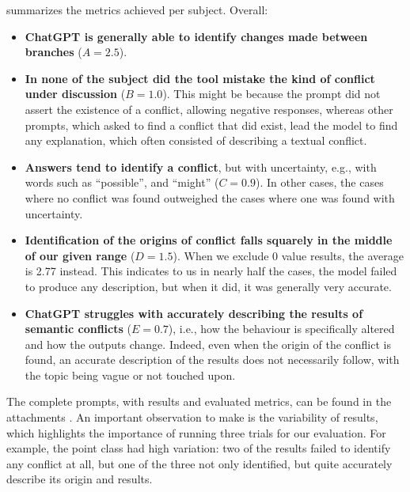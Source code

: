  summarizes the metrics achieved per subject. %
Overall:
%
\begin{itemize}
  \item \textbf{ChatGPT is generally able to identify changes made between branches} ($A=2.5$).

  \item \textbf{In none of the subject did the tool mistake the kind of conflict under discussion} ($B=1.0$). This might be because the prompt did not assert the existence of a conflict, allowing negative responses, whereas other prompts, which asked to find a conflict that did exist, lead the model to find any explanation, which often consisted of describing a textual conflict.

  \item \textbf{Answers tend to identify a conflict}, but with uncertainty, e.g., with words such as ``possible'', and ``might'' ($C=0.9$). In other cases, the cases where no conflict was found outweighed the cases where one was found with uncertainty.

  \item \textbf{Identification of the origins of conflict falls squarely in the middle of our given range} ($D=1.5$).  When we exclude 0 value results, the average is 2.77 instead. This indicates to us in nearly half the cases, the model failed to produce any description, but when it did, it was generally very accurate.

  \item \textbf{ChatGPT struggles with accurately describing the results of semantic conflicts} ($E=0.7$), i.e., how the behaviour is specifically altered and how the outputs change. Indeed, even when the origin of the conflict is found, an accurate description of the results does not necessarily follow, with the topic being vague or not touched upon.
\end{itemize}

The complete prompts, with results and evaluated metrics, can be found in the attachments .
An important observation to make is the variability of results, which highlights the importance of running three trials for our evaluation.
For example, the point class had high variation: two of the results failed to identify any conflict at all, but one of the three not only identified, but quite accurately describe its origin and results.

